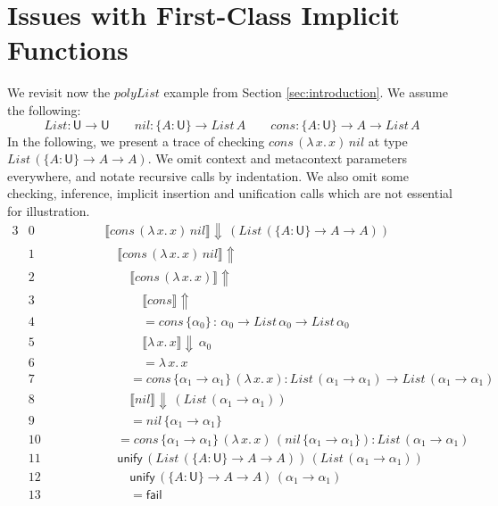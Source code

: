 \documentclass[acmsmall,review,anonymous,prologue,dvipsnames]{acmart}\settopmatter{printfolios=true,printccs=false,printacmref=false}
\renewcommand{\U}{\mathsf{U}}
\newcommand{\unify}{\mathsf{unify}}
\newcommand{\fail}{\mathsf{fail}}
\newcommand{\echeckt}[2]{\llbracket#1\rrbracket\!\Downarrow\,#2}
\newcommand{\einfert}[1]{\llbracket#1\rrbracket\!\Uparrow}
\theoremstyle{remark}
\begin{document}
\section{Issues with First-Class Implicit Functions}
\label{sec:issues}


We revisit now the $polyList$ example from Section \ref{sec:introduction}. We
assume the following:
\[
List : \U \to \U \qquad nil : \{A : \U\} \to List\,A \qquad
cons : \{A : \U\} \to A \to List\,A
\]
In the following, we present a trace of checking $cons\,(\lambda\,x.\,x)\,nil$
at type $List\,(\{A : \U\}\to A \to A)$. We omit context and metacontext
parameters everywhere, and notate recursive calls by indentation. We also omit
some checking, inference, implicit insertion and unification calls which are not
essential for illustration.
\begin{alignat*}{3}
  & \scriptstyle{0 }\qquad\qquad && \echeckt{cons\,(\lambda\,x.\,x)\,nil}{(List\,(\{A : \U\}\to A \to A))}
     \hspace{14em}\\
  & \scriptstyle{1 }  && \quad \einfert{cons\,(\lambda\,x.\,x)\,nil} \\
  & \scriptstyle{2 }  && \qquad \einfert{cons\,(\lambda\,x.\,x)}\\
  & \scriptstyle{3 }  && \qquad\quad \einfert{cons}\\
  & \scriptstyle{4 }  && \qquad\quad = cons\,\{\alpha_0\}\,:\,\alpha_0 \to List\,\alpha_0 \to List\,\alpha_0\\
  & \scriptstyle{5 }  && \qquad\quad \echeckt{\lambda\,x.\,x}{\alpha_0}\\
  & \scriptstyle{6 }  && \qquad\quad = \lambda\,x.\,x\\
  & \scriptstyle{7 }  && \qquad = cons\,\{\alpha_1 \to \alpha_1\}\,(\lambda\,x.\,x) : List\,(\alpha_1\to\alpha_1) \to List\,(\alpha_1\to\alpha_1)\\
  & \scriptstyle{8 }  && \qquad \echeckt{nil}{(List\,(\alpha_1\to\alpha_1))}\\
  & \scriptstyle{9 }  && \qquad = nil\,\{\alpha_1\to\alpha_1\}\\
  & \scriptstyle{10} && \quad = cons\,\{\alpha_1 \to \alpha_1\}\,(\lambda\,x.\,x)\,(nil\,\{\alpha_1\to\alpha_1\}): List\,(\alpha_1\to\alpha_1)\\
  & \scriptstyle{11} && \quad \unify\,(List\,(\{A : \U\}\to A \to A))\,(List\,(\alpha_1\to\alpha_1))\\
  & \scriptstyle{12} && \qquad \unify\,(\{A : \U\}\to A \to A)\,(\alpha_1\to\alpha_1)\\
  & \scriptstyle{13} && \qquad = \fail
\end{alignat*}
\end{document}
